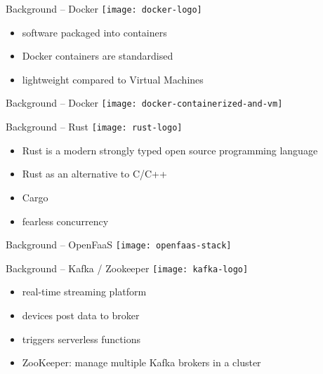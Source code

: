 \begin{frame}{Background -- Docker}
  \texttt{[image: docker-logo]}

  \vspace*{1.5em}

  \begin{itemize}
    \item software packaged into containers
    \item Docker containers are standardised
    \item lightweight compared to Virtual Machines
  \end{itemize}
\end{frame}

\begin{frame}{Background -- Docker}
  \vfill
  \texttt{[image: docker-containerized-and-vm]}
\end{frame}

\begin{frame}{Background -- Rust}
  \texttt{[image: rust-logo]}

  \vspace*{1.5em}

  \begin{itemize}
    \item Rust is a modern strongly typed open source programming language
    \item Rust as an alternative to C/C++
    \item Cargo
    \item fearless concurrency
  \end{itemize}
\end{frame}

\begin{frame}{Background -- OpenFaaS}
  \texttt{[image: openfaas-stack]}
\end{frame}

\begin{frame}{Background -- Kafka / Zookeeper}
  \texttt{[image: kafka-logo]}

  \vspace*{1.5em}

  \begin{itemize}
    \item real-time streaming platform
    \item devices post data to broker
    \item triggers serverless functions
    \item ZooKeeper: manage multiple Kafka brokers in a cluster
  \end{itemize}
\end{frame}

